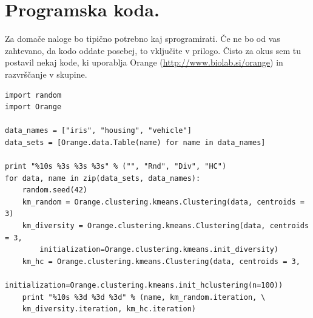 \documentclass[a4paper,11pt]{article}
\begin{document}
\section{\label{app-code}Programska koda.}

Za domače naloge bo tipično potrebno kaj sprogramirati. Če ne bo od
vas zahtevano, da kodo oddate posebej, to vključite v prilogo. Čisto
za okus sem tu postavil nekaj kode, ki uporablja Orange
(\url{http://www.biolab.si/orange}) in razvrščanje v skupine.


\begin{lstlisting}
import random
import Orange

data_names = ["iris", "housing", "vehicle"]
data_sets = [Orange.data.Table(name) for name in data_names]

print "%10s %3s %3s %3s" % ("", "Rnd", "Div", "HC")
for data, name in zip(data_sets, data_names):
    random.seed(42)
    km_random = Orange.clustering.kmeans.Clustering(data, centroids = 3)
    km_diversity = Orange.clustering.kmeans.Clustering(data, centroids = 3,
        initialization=Orange.clustering.kmeans.init_diversity)
    km_hc = Orange.clustering.kmeans.Clustering(data, centroids = 3,
        initialization=Orange.clustering.kmeans.init_hclustering(n=100))
    print "%10s %3d %3d %3d" % (name, km_random.iteration, \
    km_diversity.iteration, km_hc.iteration)
\end{lstlisting}
\end{document}
